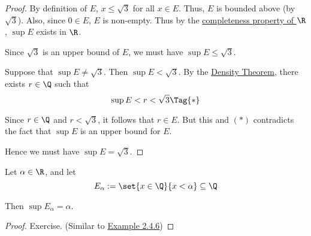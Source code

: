 \begin{proof}
  By definition of $E$, $x\leq\sqrt3$ for all $x\in E$. Thus, $E$ is bounded
  above (by $\sqrt3$). Also, since $0\in E$, $E$ is non-empty. Thus by the
  \href{f330cf9}{completeness property of $\R$}, $\sup E$ exists in $\R$.

  Since $\sqrt3$ is an upper bound of $E$, we must have $\sup E\leq\sqrt3$.

  Suppose that $\sup E\neq\sqrt3$. Then $\sup E<\sqrt3$. By the
  \href{d0c9c52}{Density Theorem}, there exists $r\in\Q$ such that
  \begin{equation*}
    \sup E<r<\sqrt3\Tag{*}
  \end{equation*}

  Since $r\in\Q$ and $r<\sqrt3$, it follows that $r\in E$. But this and $(*)$
  contradicts the fact that $\sup E$ is an upper bound for $E$.

  Hence we must have $\sup E=\sqrt3$.
\end{proof}

\label{d4d76b6}

Let $\alpha\in\R$, and let
$$
  E_\alpha:=\set{x\in\Q}{x<\alpha}\subseteq\Q
$$

Then $\sup E_\alpha=\alpha$.

\begin{proof}
  Exercise. (Similar to \href{ade99b7}{Example 2.4.6})
\end{proof}

